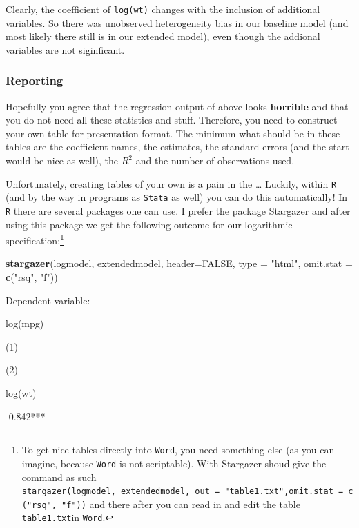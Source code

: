 \documentclass[]{article}
\newenvironment{Shaded}{\begin{snugshade}}{\end{snugshade}}
\newcommand{\KeywordTok}[1]{\textcolor[rgb]{0.13,0.29,0.53}{\textbf{{#1}}}}
\newcommand{\DataTypeTok}[1]{\textcolor[rgb]{0.13,0.29,0.53}{{#1}}}
\newcommand{\StringTok}[1]{\textcolor[rgb]{0.31,0.60,0.02}{{#1}}}
\newcommand{\OtherTok}[1]{\textcolor[rgb]{0.56,0.35,0.01}{{#1}}}
\newcommand{\NormalTok}[1]{{#1}}
\let\rmarkdownfootnote\footnote%
\def\footnote{\protect\rmarkdownfootnote}
\begin{document}
Clearly, the coefficient of \texttt{log(wt)} changes with the inclusion
of additional variables. So there was unobserved heterogeneity bias in
our baseline model (and most likely there still is in our extended
model), even though the addional variables are not siginficant.

\subsubsection{Reporting}\label{reporting}

Hopefully you agree that the regression output of above looks
\textbf{horrible} and that you do not need all these statistics and
stuff. Therefore, you need to construct your own table for presentation
format. The minimum what should be in these tables are the coefficient
names, the estimates, the standard errors (and the start would be nice
as well), the \(R^2\) and the number of observations used.

Unfortunately, creating tables of your own is a pain in the \ldots{}
Luckily, within \texttt{R} (and by the way in programs as \texttt{Stata}
as well) you can do this automatically! In \texttt{R} there are several
packages one can use. I prefer the package Stargazer and after using
this package we get the following outcome for our logarithmic
specification:\footnote{To get nice tables directly into \texttt{Word},
  you need something else (as you can imagine, because \texttt{Word} is
  not scriptable). With Stargazer shoud give the command as such
  \texttt{stargazer(logmodel,\ extendedmodel,\ out\ =\ "table1.txt",omit.stat\ =\ c("rsq",\ "f"))}
  and there after you can read in and edit the table
  \texttt{table1.txt}in \texttt{Word}.}

\begin{Shaded}
\begin{Highlighting}[]
\KeywordTok{stargazer}\NormalTok{(logmodel, extendedmodel, }\DataTypeTok{header=}\OtherTok{FALSE}\NormalTok{, }\DataTypeTok{type =} \StringTok{"html"}\NormalTok{, }\DataTypeTok{omit.stat =} \KeywordTok{c}\NormalTok{(}\StringTok{"rsq"}\NormalTok{, }\StringTok{"f"}\NormalTok{))}
\end{Highlighting}
\end{Shaded}

Dependent variable:

log(mpg)

(1)

(2)

log(wt)

-0.842***
\end{document}
